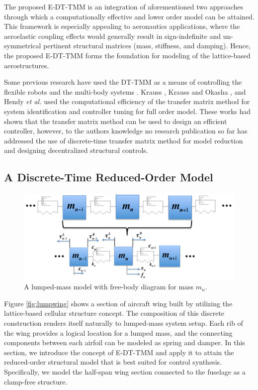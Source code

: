 \documentclass[11pt]{ucthesis}
\begin{document}
The proposed E-DT-TMM is an integration of aforementioned two approaches through which a computationally effective and lower order model can be attained. This framework is especially appealing to aeronautics applications, where the aeroelastic coupling effects would generally result in sign-indefinite and un-symmetrical pertinent structural matrices (mass, stiffness, and damping). Hence, the proposed E-DT-TMM forms the foundation for modeling of the lattice-based aerostructures.
 
Some previous research have used the DT-TMM as a means of controlling the flexible robots \cite{krauss2013discrete, krauss2011computationally} and the multi-body systems  \cite{rong2010discrete,rui2012discrete,hendy2014controller}. Krauss \cite{krauss2011computationally}, Krauss and Okasha \cite{krauss2013discrete}, and Hendy {\it et al.} \cite{hendy2014controller} used the computational efficiency of the transfer matrix method for system identification and controller tuning for full order model. These works had shown that the transfer matrix method can be used to design an efficient controller, however, to the authors knowledge no research publication so far has addressed the use of discrete-time transfer matrix method for model reduction and designing decentralized structural controls.

\subsection{A Discrete-Time Reduced-Order Model}
\label{sec:DTTMM}

\begin{figure}[thpb]
\centering
\includegraphics[width=1\linewidth]{Figures/full_mass_n.png}
\caption{A lumped-mass model with free-body diagram for mass $m_n$.}
\label{fig:gen}
\end{figure}

Figure \ref{fig:lumpwing} shows a section of aircraft wing built by utilizing the lattice-based cellular structure concept. The composition of this discrete construction renders itself naturally to lumped-mass system setup. Each rib of the wing provides a logical location for a lumped mass, and the connecting components between each airfoil can be modeled as spring and damper. In this section, we introduce the concept of E-DT-TMM and apply it to attain the reduced-order structural model that is best suited for control synthesis. Specifically, we model the half-span wing section connected to the fuselage as a clamp-free structure. 
\end{document}
